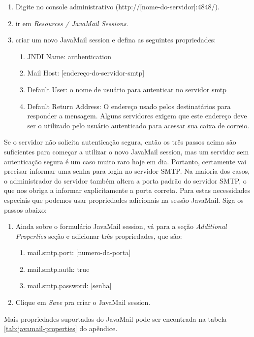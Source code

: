 \documentclass[envcountsame,envcountchap,letterpaper]{svmono}
\begin{document}
\begin{enumerate}
\item Digite no console administrativo (http://[nome-do-servidor]:4848/).
\item ir em \textit{Resources / JavaMail Sessions}.
\item criar um novo JavaMail session e defina as seguintes propriedades:
   \begin{enumerate}
   \item JNDI Name: authentication
   \item Mail Host: [endereço-do-servidor-smtp]
   \item Default User: o nome de usuário para autenticar no servidor smtp
   \item Default Return Address: O endereço usado pelos destinatários para responder a mensagem. Alguns servidores exigem que este endereço deve ser o utilizado pelo usuário autenticado para acessar sua caixa de correio.
   \end{enumerate}
\end{enumerate}
 
Se o servidor não solicita autenticação segura, então os três passos acima são suficientes para começar a utilizar o novo JavaMail session, mas um servidor sem autenticação segura é um caso muito raro hoje em dia. Portanto, certamente vai precisar informar uma senha para login no servidor SMTP. Na maioria dos casos, o administrador do servidor também altera a porta padrão do servidor SMTP, o que nos obriga a informar explicitamente a porta correta. Para estas necessidades especiais que podemos usar propriedades adicionais na sessão JavaMail. Siga os passos abaixo:

\begin{enumerate}
\item Ainda sobre o formulário JavaMail session, vá para a seção \textit{Additional Properties} seção e adicionar três propriedades, que são:
   \begin{enumerate}
   \item mail.smtp.port: [numero-da-porta]
   \item mail.smtp.auth: true
   \item mail.smtp.password: [senha]
   \end{enumerate}
\item Clique em \textit{Save} pra criar o JavaMail session.
\end{enumerate}

Mais propriedades suportadas do JavaMail pode ser encontrada na tabela \ref{tab:javamail-properties} do apêndice.
\end{document}
